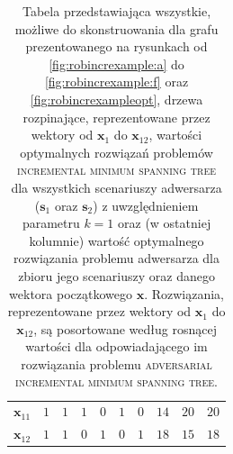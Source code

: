 \begin{table}[!htbp]
\begin{tabular}{cccccccccc}
		$\textbf{x}_{11}$	&	$1$	&	$1$	&	$1$	&	$0$	&	$1$	&	$0$	&	$14$	&	$20$	&	$20$	\\
		$\textbf{x}_{12}$	&	$1$	&	$1$	&	$0$	&	$1$	&	$0$	&	$1$	&	$18$	&	$15$	&	$18$	\\
		\hline
	\end{tabular}
	\caption{
		Tabela przedstawiająca wszystkie, możliwe do skonstruowania dla grafu prezentowanego na rysunkach od \ref{fig:robincrexample:a} do \ref{fig:robincrexample:f} oraz \ref{fig:robincrexampleopt}, drzewa rozpinające, reprezentowane przez wektory od $\textbf{x}_{1}$ do $\textbf{x}_{12}$, wartości optymalnych rozwiązań problemów \textsc{incremental minimum spanning tree} dla wszystkich scenariuszy adwersarza ($\textbf{s}_{1}$ oraz $\textbf{s}_{2}$) z uwzględnieniem parametru $k = 1$ oraz (w ostatniej kolumnie) wartość optymalnego rozwiązania problemu adwersarza dla zbioru jego scenariuszy oraz danego wektora początkowego $\textbf{x}$. Rozwiązania, reprezentowane przez wektory od $\textbf{x}_{1}$ do $\textbf{x}_{12}$, są posortowane według rosnącej wartości dla odpowiadającego im rozwiązania problemu \textsc{adversarial incremental minimum spanning tree}.
	}
	\label{tab:minmaxrobexample}
\end{table}


